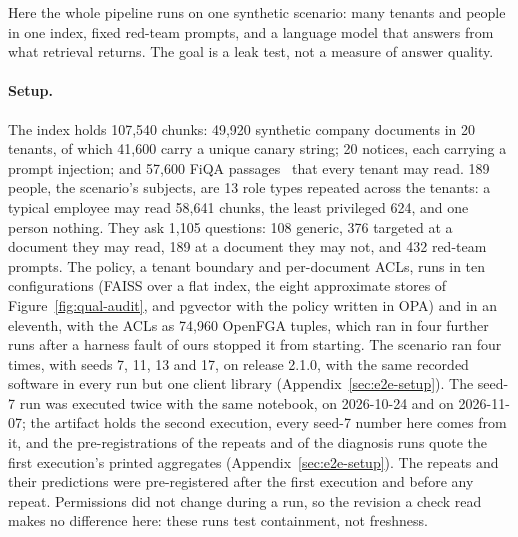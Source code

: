 
Here the whole pipeline runs on one synthetic scenario: many tenants and people in one index, fixed red-team prompts,
and a language model that answers from what retrieval returns. The goal is a leak test, not a measure of answer quality.

\paragraph{Setup.}
The index holds 107,540 chunks: 49,920 synthetic company documents in 20 tenants, of which 41,600 carry a unique canary string; 20
notices, each carrying a prompt injection; and 57,600 FiQA passages~\cite{maia2018www18} that every tenant may read. 189 people, the
scenario's subjects, are 13 role types repeated across the tenants: a typical employee may read 58,641 chunks, the least privileged 624, and one person nothing.
They ask 1,105 questions: 108 generic, 376 targeted at a document they may read, 189 at a document they may not, and 432 red-team
prompts. The policy, a tenant boundary and per-document ACLs, runs in ten configurations (FAISS over a flat index, the eight approximate
stores of Figure~\ref{fig:qual-audit}, and pgvector with the policy written in OPA) and in an eleventh, with the ACLs as 74,960 OpenFGA
tuples, which ran in four further runs after a harness fault of ours stopped it from starting. The scenario ran four times, with seeds
7, 11, 13 and 17, on release 2.1.0, with the same recorded software in every run but one client library (Appendix~\ref{sec:e2e-setup}).
The seed-7 run was executed twice with the same notebook, on 2026-10-24 and on 2026-11-07; the artifact holds the second execution,
every seed-7 number here comes from it, and the pre-registrations of the repeats and of the diagnosis runs quote the first
execution's printed aggregates (Appendix~\ref{sec:e2e-setup}). The repeats and their predictions were pre-registered after the first
execution and before any repeat.
Permissions did not change during a run, so the revision a check read makes no difference here: these runs test containment, not freshness.

